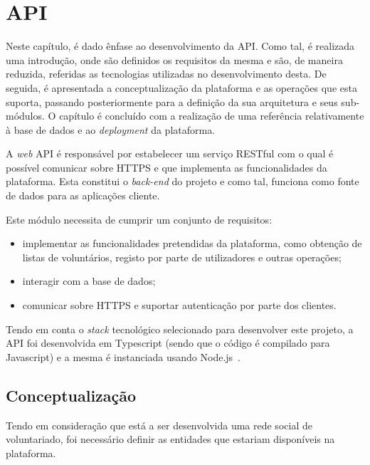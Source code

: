 \section{API}

Neste capítulo, é dado ênfase ao desenvolvimento da API. Como tal, é realizada uma introdução, onde são definidos os requisitos da mesma e são, de maneira reduzida, referidas as tecnologias utilizadas no desenvolvimento desta. De seguida, é apresentada a conceptualização da plataforma e as operações que esta suporta, passando posteriormente para a definição da sua arquitetura e seus sub-módulos. O capítulo é concluído com a realização de uma referência relativamente à base de dados e ao \textit{deployment} da plataforma.

\medskip \par

A \textit{web} API é responsável por estabelecer um serviço RESTful com o qual é possível comunicar sobre HTTPS e que implementa as funcionalidades da plataforma. Esta constitui o \textit{back-end} do projeto e como tal, funciona como fonte de dados para as aplicações cliente.

\medskip \par

Este módulo necessita de cumprir um conjunto de requisitos:

\begin{itemize}
	\item implementar as funcionalidades pretendidas da plataforma, como obtenção de listas de voluntários, registo por parte de utilizadores e outras operações;
	\item interagir com a base de dados;
	\item comunicar sobre HTTPS e suportar autenticação por parte dos clientes.
\end{itemize}

\medskip \par

Tendo em conta o \textit{stack} tecnológico selecionado para desenvolver este projeto, a API foi  desenvolvida em Typescript (sendo que o código é compilado para Javascript) e a mesma é instanciada usando Node.js~\cite{Wilson2018}.

\subsection{Conceptualização}

Tendo em consideração que está a ser desenvolvida uma rede social de voluntariado, foi necessário definir as entidades que estariam disponíveis na plataforma. 

